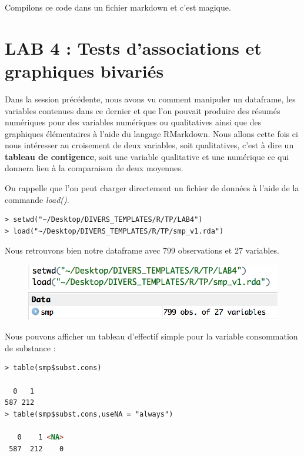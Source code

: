 Compilons ce code dans un fichier markdown et c'est magique.
%
\newpage

\section{LAB 4 : Tests d'associations et graphiques bivariés}

Dans la session précédente, nous avons vu comment manipuler un dataframe, les variables contenues dans ce dernier et que l'on pouvait produire des résumés numériques pour des variables numériques ou qualitatives ainsi que des graphiques élémentaires à l'aide du langage RMarkdown.\newline
Nous allons cette fois ci nous intéresser au croisement de deux variables, soit qualitatives, c'est à dire un \textbf{tableau de contigence}, soit une variable qualitative et une numérique ce qui donnera lieu à la comparaison de deux moyennes.\newline

On rappelle que l'on peut charger directement un fichier de données à l'aide de la commande \textit{load()}.

\begin{lstlisting}[language=html]
> setwd("~/Desktop/DIVERS_TEMPLATES/R/TP/LAB4")
> load("~/Desktop/DIVERS_TEMPLATES/R/TP/smp_v1.rda")
\end{lstlisting}
Nous retrouvons bien notre dataframe avec 799 observations et 27 variables.

\begin{figure}[H]\begin{center}\includegraphics[scale=0.6]{ilu/cf.png}\\\includegraphics[scale=0.6]{ilu/cg.png}\end{center}\end{figure}
Nous pouvons afficher un tableau d'effectif simple pour la variable consommation de substance : 
\begin{lstlisting}[language=html]
> table(smp$subst.cons)

  0   1 
587 212 
> table(smp$subst.cons,useNA = "always")

   0    1 <NA> 
 587  212    0 
\end{lstlisting}

